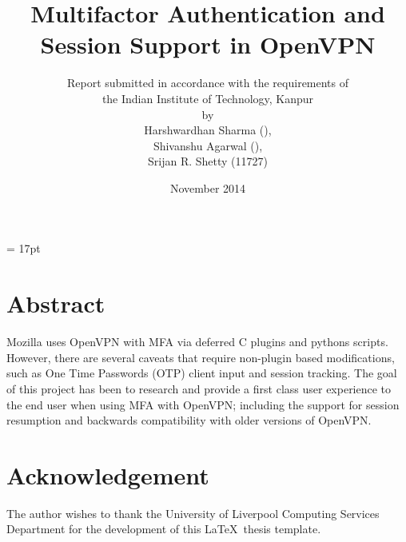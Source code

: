 \documentclass[11pt,oneside]{book}
\begin{document}
\baselineskip = 17pt


\title{Multifactor Authentication and Session Support in OpenVPN}
\author{Report submitted in accordance with the requirements of \\
the Indian Institute of Technology, Kanpur \\
by \\
Harshwardhan Sharma (),\\
Shivanshu Agarwal (),\\
Srijan R. Shetty (11727)}
\date{November 2014}
\maketitle
\frontmatter

\chapter{Abstract}
Mozilla uses OpenVPN with MFA via deferred C plugins and pythons scripts.
However, there are several caveats that require non-plugin based modifications,
such as One Time Passwords (OTP) client input and session tracking.
The goal of this project has been to research and provide a first class user experience
to the end user when using MFA with OpenVPN; including the support for session resumption
and backwards compatibility with older versions of OpenVPN.

\tableofcontents



\listoffigures





\chapter{Acknowledgement}

The author wishes to thank the University of
Liverpool Computing Services Department for the development of this
\LaTeX \ thesis template.

\printglossary

\end{document}
